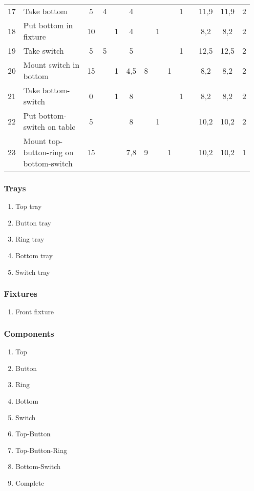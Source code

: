 \documentclass[10pt,a4paper]{report}
\begin{document}
\begin{landscape}
\begin{tabular}{clcccccccccccc}
17 & Take bottom 								& 5   & 4 &   & 4   &   &   &   & 1 &   & 11,9 & 11,9 & 2\\
18 & Put bottom in fixture 						& 10  &   & 1 & 4   &   & 1 &   &   &   & 8,2  & 8,2  & 2\\
19 & Take switch 								& 5   & 5 &   & 5   &   &   &   & 1 &   & 12,5 & 12,5 & 2\\
20 & Mount switch in bottom 					& 15  &   & 1 & 4,5 & 8 &   & 1 &   &   & 8,2  & 8,2  & 2\\
21 & Take bottom-switch							& 0   &   & 1 & 8   &   &   &   & 1 &   & 8,2  & 8,2  & 2\\
22 & Put bottom-switch on table					& 5   &   &   & 8   &   & 1 &   &   &   & 10,2 & 10,2 & 2\\
23 & Mount top-button-ring on bottom-switch 	& 15  &   &   & 7,8 & 9 &   & 1 &   &   & 10,2 & 10,2 & 1
\end{tabular}
\end{landscape}

\subsubsection*{Trays}
\begin{enumerate}
\item Top tray
\item Button tray
\item Ring tray
\item Bottom tray
\item Switch tray
\end{enumerate}

\subsubsection*{Fixtures}
\begin{enumerate}
\item Front fixture
\end{enumerate}

\subsubsection*{Components}
\begin{enumerate}
\item Top
\item Button
\item Ring
\item Bottom
\item Switch
\item Top-Button
\item Top-Button-Ring
\item Bottom-Switch
\item Complete
\end{enumerate}
\end{document}
